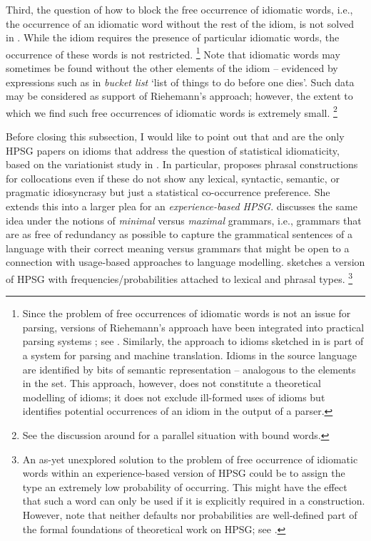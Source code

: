 \documentclass[output=paper
	        ,collection
	        ,collectionchapter
 	        ,biblatex
                ,babelshorthands
                ,newtxmath
                ,draftmode
                ,colorlinks, citecolor=brown
]{langscibook}
\begin{document}
Third, the question of how to block the free occurrence of idiomatic words, i.e., the occurrence of an idiomatic word without the rest of the idiom, is not solved in \citet{Riehemann2001a}. While the idiom requires the presence of particular idiomatic words, the occurrence of these words is not restricted.%
\footnote{Since the problem of free occurrences of idiomatic words is not an issue for parsing, versions of Riehemann's approach have been integrated into practical parsing systems \citep{Villavicencio:Copestake:02}; see . 
Similarly, the approach to idioms sketched in \citet{Flickinger:15Slides2} 
is part of a system for parsing and machine translation. Idioms in the source language are identified by bits of semantic representation -- analogous to the elements in the  set. This approach, however, does not constitute a theoretical modelling of idioms; it does not exclude ill-formed uses of idioms but identifies potential occurrences of an idiom in the output of a parser.}
Note that idiomatic words may sometimes be found without the other elements of the idiom -- evidenced by expressions such as in \emph{bucket list} `list of things to do before one dies'.
Such data may be considered as support of Riehemann's approach; however, the extent to which we find such free occurrences of idiomatic words is extremely small.%
\footnote{See the discussion around  for a parallel situation with bound words.}


Before closing this subsection, I would like to point out that 
\citet{Riehemann2001a} and \citet{RB99a} are the only HPSG papers on idioms that address the question of statistical idiomaticity, based on the variationist study in \citet{Bender2000a}. 
In particular, \citet[--301]{Riehemann2001a} proposes phrasal constructions for collocations even if these do not show any lexical, syntactic, semantic, or pragmatic idiosyncrasy but just a statistical co-occurrence preference. 
She extends this into a larger plea for an \emph{experience-based HPSG}. 
%
\citet{Bender2000a} discusses the same idea under the notions of \emph{minimal} versus \emph{maximal} grammars, i.e., grammars that are as free of redundancy as possible to capture the grammatical sentences of a language with their correct meaning versus grammars that might be open to a connection with usage-based approaches to language modelling.
\citet[]{Bender2000a} sketches a version of HPSG with frequencies/probabilities attached to lexical and phrasal types.%
\footnote{An as-yet unexplored solution to the problem of free occurrence of idiomatic words within an experience-based version of HPSG could be to assign the type  an extremely low probability of occurring. This might have the effect that such a word can only be used if it is explicitly required in a construction. However, note that neither defaults nor probabilities are well-defined part of the formal foundations of theoretical work on HPSG; see .}
\end{document}
